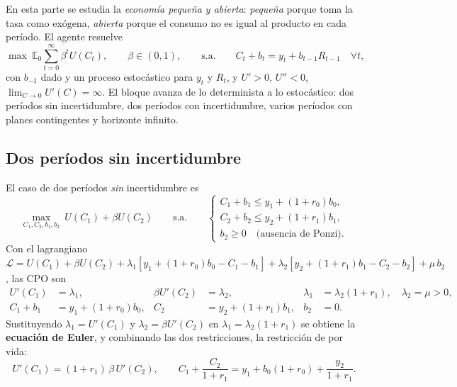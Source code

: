 \documentclass[11pt]{article}
\theoremstyle{definition}
\newcommand{\E}{\mathbb{E}}
\begin{document}
En esta parte se estudia la \emph{economía pequeña y abierta}: \emph{pequeña} porque toma la tasa como
exógena, \emph{abierta} porque el consumo no es igual al producto en cada período. El agente resuelve
\begin{equation}
\max\ \E_{0}\sum_{t=0}^{\infty}\beta^{t}U(C_{t}),\qquad \beta\in(0,1),
\qquad\text{s.a.}\qquad
C_{t}+b_{t}=y_{t}+b_{t-1}R_{t-1}\quad\forall t,
\end{equation}
con $b_{-1}$ dado y un proceso estocástico para $y_{t}$ y $R_{t}$, y $U'>0$, $U''<0$,
$\lim_{C\to0}U'(C)=\infty$. El bloque avanza de lo determinista a lo estocástico: dos períodos sin
incertidumbre, dos períodos con incertidumbre, varios períodos con planes contingentes y horizonte
infinito.

\subsection{Dos períodos sin incertidumbre}

El caso de dos períodos \emph{sin} incertidumbre es
\begin{equation}
\max_{C_{1},C_{2},b_{1},b_{2}}\ U(C_{1})+\beta U(C_{2})
\qquad\text{s.a.}\qquad
\begin{cases}
C_{1}+b_{1}\le y_{1}+(1+r_{0})b_{0},\\[2pt]
C_{2}+b_{2}\le y_{2}+(1+r_{1})b_{1},\\[2pt]
b_{2}\ge0\quad\text{(ausencia de Ponzi).}
\end{cases}
\end{equation}
Con el lagrangiano
$\mathcal{L}=U(C_{1})+\beta U(C_{2})+\lambda_{1}[y_{1}+(1+r_{0})b_{0}-C_{1}-b_{1}]
+\lambda_{2}[y_{2}+(1+r_{1})b_{1}-C_{2}-b_{2}]+\mu\,b_{2}$, las CPO son
\begin{align}
U'(C_{1})&=\lambda_{1}, & \beta U'(C_{2})&=\lambda_{2}, & \lambda_{1}&=\lambda_{2}(1+r_{1}),\quad \lambda_{2}=\mu>0,\\
C_{1}+b_{1}&=y_{1}+(1+r_{0})b_{0}, & C_{2}&=y_{2}+(1+r_{1})b_{1}, & b_{2}&=0 .
\end{align}
Sustituyendo $\lambda_{1}=U'(C_{1})$ y $\lambda_{2}=\beta U'(C_{2})$ en $\lambda_{1}=\lambda_{2}(1+r_{1})$
se obtiene la \textbf{ecuación de Euler}, y combinando las dos restricciones, la restricción de por
vida:
\begin{equation}
U'(C_{1})=(1+r_{1})\,\beta\,U'(C_{2}),
\qquad
C_{1}+\frac{C_{2}}{1+r_{1}}=y_{1}+b_{0}(1+r_{0})+\frac{y_{2}}{1+r_{1}} .
\end{equation}
\end{document}
